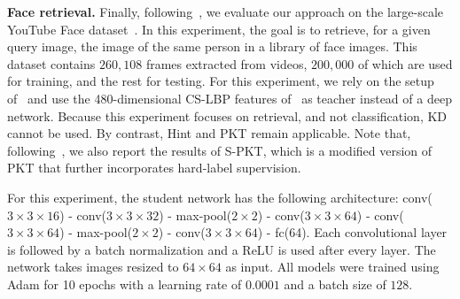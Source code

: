 \documentclass[10pt,twocolumn,letterpaper]{article}
\begin{document}
\vspace{0.2cm}\noindent\textbf{Face retrieval.} Finally, following~\cite{pkt_eccv}, we evaluate our approach on the large-scale YouTube Face dataset~\cite{conf/cvpr/WolfHM11}. In this experiment, the goal is to retrieve, for a given query image, the image of the same person in a library of face images.
This dataset contains $260,108$ frames extracted from videos, $200,000$ of which are used for training, and the rest for testing. For this experiment, we rely on the setup of~\cite{pkt_eccv} and use the 480-dimensional CS-LBP features of~\cite{conf/cvpr/WolfHM11} as teacher instead of a deep network. Because this experiment focuses on retrieval, and not classification, KD cannot be used. By contrast, Hint and PKT remain applicable. Note that, following~\cite{pkt_eccv}, we also report the results of S-PKT, which is a modified version of PKT that further incorporates hard-label supervision. 


For this experiment, the student network has the following architecture: conv($3\times3\times16$) - conv($3\times3\times32$) - max-pool($2\times 2$) - conv($3\times3\times64$) - conv($3\times3\times64$) - max-pool($2\times 2$) - conv($3\times3\times64$) - fc(64). Each convolutional layer is followed by a batch normalization and a ReLU is used after every layer. The network takes images resized to $64 \times 64$ as input. All models were trained using Adam  for 10 epochs with a learning rate of $0.0001$ and a batch size of $128$.

\begin{table}[t]
    \centering
    \vspace{0.01cm}
    \caption{{\bf Knowledge transfer on the YouTube Face dataset.}}
    \label{table:yf}
\end{table}
\end{document}
